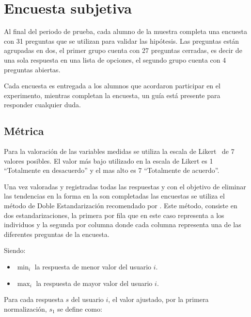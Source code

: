 \section{Encuesta subjetiva}
\label{sec:subjetiva}

Al final del periodo de prueba, cada alumno de la muestra completa una encuesta
con 31 preguntas que se utilizan para validar las hipótesis. Las preguntas están
agrupadas en dos, el primer grupo cuenta con 27 preguntas cerradas, es decir de
una sola respuesta en una lista de opciones, el segundo grupo cuenta con 4
preguntas abiertas. 

Cada encuesta es entregada a los alumnos que acordaron participar en el
experimento, mientras completan la encuesta, un guía está presente para
responder cualquier duda.

\subsection{Métrica}
\label{sec:metrica}
\label{sec:likert}


Para la valoración de las variables medidas se utiliza la escala de
Likert~\cite{Allen:2007} de 7 valores posibles. El valor más bajo utilizado en
la escala de Likert es 1 ``Totalmente en desacuerdo'' y el mas alto es 7
``Totalmente de acuerdo''.

Una vez valoradas y registradas todas las respuestas y con el objetivo de
eliminar las tendencias en la forma en la son completadas las encuestas
\cite{Fischer2010} se utiliza el método de Doble Estandarización recomendado por
\cite{Pagolu2011}. Este método, consiste en dos estandarizaciones, la primera
por fila que en este caso representa a los individuos y la segunda por columna
donde cada columna representa una de las diferentes preguntas de la encuesta.

Siendo:
\begin{itemize}
	\item $\min_i$ la respuesta de menor valor del usuario $i$.
	\item $\max_i$ la respuesta de mayor valor del usuario $i$.
\end{itemize}

Para cada respuesta $s$ del usuario $i$, el valor ajustado, por la primera 
normalización, $s_1$ se define como:

